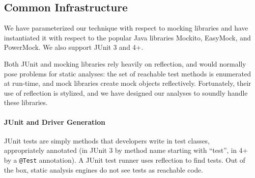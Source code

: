 

\subsection{Common Infrastructure}
\label{sec:common}
We have parameterized our technique with respect to mocking libraries and have instantiated it with respect to the popular Java libraries Mockito, EasyMock, and PowerMock. We also support JUnit 3 and 4+. %

Both JUnit and mocking libraries rely heavily on reflection, and would normally pose problems for static analyses: the set of reachable test methods is enumerated at run-time, and mock libraries create mock objects reflectively. Fortunately, their use of reflection is stylized, and we have designed our analyses to soundly handle these libraries.

\paragraph{JUnit and Driver Generation}
JUnit tests are simply methods that developers write in test classes, appropriately annotated (in JUnit 3 by method name starting with ``test'', in 4+ by a \texttt{@Test} annotation). A JUnit test runner uses reflection to find tests. Out of the box, static analysis engines do not see tests as reachable code.


